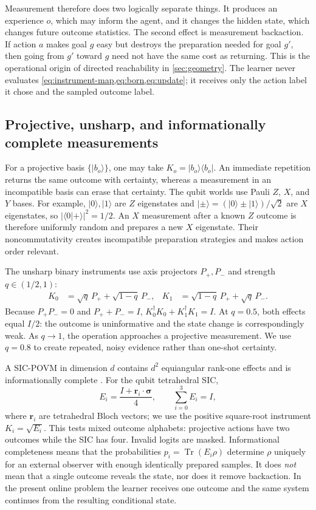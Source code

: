 \documentclass[11pt]{article}
\newcommand{\Tr}{\operatorname{Tr}}
\begin{document}
Measurement therefore does two logically separate things. It produces an
experience $o$, which may inform the agent, and it changes the hidden state,
which changes future outcome statistics. The second effect is measurement
backaction. If action $a$ makes goal $g$ easy but destroys the preparation
needed for goal $g'$, then going from $g'$ toward $g$ need not have the same
cost as returning. This is the operational origin of directed reachability in
\cref{sec:geometry}. The learner never evaluates
\cref{eq:instrument-map,eq:born,eq:update}; it receives only the action label it
chose and the sampled outcome label.

\subsection{Projective, unsharp, and informationally complete measurements}

For a projective basis $\{|b_o\rangle\}$, one may take
$K_o=|b_o\rangle\langle b_o|$. An immediate repetition returns the same
outcome with certainty, whereas a measurement in an incompatible basis can
erase that certainty. The qubit worlds use Pauli $Z$, $X$, and $Y$ bases. For
example, $|0\rangle,|1\rangle$ are $Z$ eigenstates and
$|\pm\rangle=(|0\rangle\pm|1\rangle)/\sqrt2$ are $X$ eigenstates, so
$|\langle0|+\rangle|^2=1/2$. An $X$ measurement after a known $Z$ outcome is
therefore uniformly random and prepares a new $X$ eigenstate. Their
noncommutativity creates incompatible preparation strategies and makes action
order relevant.

The unsharp binary instruments use axis projectors $P_+,P_-$ and strength
$q\in(1/2,1)$:
\begin{align}
 K_0&=\sqrt q\,P_+ +\sqrt{1-q}\,P_-,&
 K_1&=\sqrt{1-q}\,P_+ +\sqrt q\,P_- . \label{eq:weak}
\end{align}
Because $P_+P_-=0$ and $P_++P_-=I$,
$K_0^\dagger K_0+K_1^\dagger K_1=I$. At $q=0.5$, both effects equal $I/2$:
the outcome is uninformative and the state change is correspondingly weak. As
$q\to1$, the operation approaches a projective measurement. We use $q=0.8$ to
create repeated, noisy evidence rather than one-shot certainty.

A SIC-POVM in dimension $d$ contains $d^2$ equiangular rank-one effects and is
informationally complete \cite{renes2004}. For the qubit tetrahedral SIC,
\begin{equation}
 E_i=\frac{I+\bm r_i\cdot\bm\sigma}{4},\qquad \sum_{i=0}^3E_i=I,
\end{equation}
where $\bm r_i$ are tetrahedral Bloch vectors; we use the positive square-root
instrument $K_i=\sqrt{E_i}$. This tests mixed outcome alphabets: projective
actions have two outcomes while the SIC has four. Invalid logits are masked.
Informational completeness means that the probabilities
$p_i=\Tr(E_i\rho)$ determine $\rho$ uniquely for an external observer with
enough identically prepared samples. It does \emph{not} mean that a single
outcome reveals the state, nor does it remove backaction. In the present online
problem the learner receives one outcome and the same system continues from
the resulting conditional state.
\end{document}
